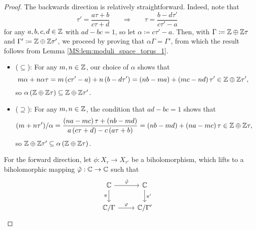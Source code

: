 \documentclass[../Moduli_Spaces_of_Riemann_Surfaces.tex]{subfiles}
\begin{document}
    \begin{proof}
        The backwards direction is relatively straightforward. Indeed, note that
        \begin{equation*}
            \tau'=\frac{a\tau+b}{c\tau+d}\ \ \ \ \ \ \ \ \Rightarrow\ \ \ \ \ \ \ \ \tau=\frac{b-d\tau'}{c\tau'-a}
        \end{equation*}
        for any $a,b,c,d\in\mathbb{Z}$ with $ad-bc=1$, so let $\alpha\coloneqq c\tau'-a$. Then, with $\Gamma\coloneqq\mathbb{Z}\oplus\mathbb{Z}\tau$ and $\Gamma'\coloneqq\mathbb{Z}\oplus\mathbb{Z}\tau'$, we proceed by proving that $\alpha\Gamma=\Gamma'$, from which the result follows from Lemma \ref{MS:lem:moduli_space_torus_1}.
        \begin{itemize}
            \item ($\subseteq$): For any $m,n\in\mathbb{Z}$, our choice of $\alpha$ shows that
                \begin{equation*}
                    m\alpha+n\alpha\tau=m\left(c\tau'-a\right)+n\left(b-d\tau'\right)=\left(nb-ma\right)+\left(mc-nd\right)\tau'\in\mathbb{Z}\oplus\mathbb{Z}\tau',
                \end{equation*}
                so $\alpha\left(\mathbb{Z}\oplus\mathbb{Z}\tau\right)\subseteq\mathbb{Z}\oplus\mathbb{Z}\tau'$.
            \item ($\supseteq$): For any $m,n\in\mathbb{Z}$, the condition that $ad-bc=1$ shows that
                \begin{equation*}
                    \left(m+n\tau'\right)\!/\alpha=\frac{\left(na-mc\right)\tau+\left(nb-md\right)}{a\left(c\tau+d\right)-c\left(a\tau+b\right)}=\left(nb-md\right)+\left(na-mc\right)\tau\in\mathbb{Z}\oplus\mathbb{Z}\tau,
                \end{equation*}
                so $\mathbb{Z}\oplus\mathbb{Z}\tau'\subseteq\alpha\left(\mathbb{Z}\oplus\mathbb{Z}\tau\right)$.
        \end{itemize}
        For the forward direction, let $\phi:X_\tau\to X_{\tau'}$ be a biholomorphism, which lifts to a biholomorphic mapping $\tilde{\varphi}:\mathbb{C}\to\mathbb{C}$ such that
        \begin{equation*}
            \begin{tikzcd}
                \C \ar[r, "\tilde{\phi}"] \ar[d, "\pi"'] & \C \ar[d, "\pi'"] \\
                \C/\Gamma \ar[r, "\phi"] & \C/\Gamma'
            \end{tikzcd}
        \end{equation*}

\end{proof}
\end{document}
